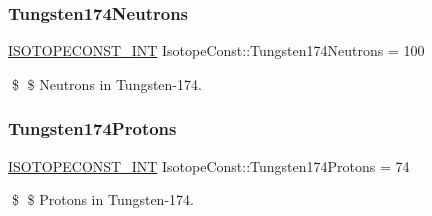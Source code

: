 \subsubsection{\texorpdfstring{Tungsten174\+Neutrons}{Tungsten174Neutrons}}
{\footnotesize\ttfamily \mbox{\hyperlink{group___isotope_const-_macros_ga5f18360b3e99483a35c32d789e62621c}{I\+S\+O\+T\+O\+P\+E\+C\+O\+N\+S\+T\+\_\+\+I\+NT}} Isotope\+Const\+::\+Tungsten174\+Neutrons = 100}

\$ \$ Neutrons in Tungsten-\/174. \mbox{\label{group___isotope_const-_tungsten-_w174_ga52c59014a2d7c00557a3e6e727f10316}} 
\subsubsection{\texorpdfstring{Tungsten174\+Protons}{Tungsten174Protons}}
{\footnotesize\ttfamily \mbox{\hyperlink{group___isotope_const-_macros_ga5f18360b3e99483a35c32d789e62621c}{I\+S\+O\+T\+O\+P\+E\+C\+O\+N\+S\+T\+\_\+\+I\+NT}} Isotope\+Const\+::\+Tungsten174\+Protons = 74}

\$ \$ Protons in Tungsten-\/174. 